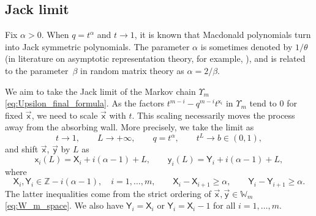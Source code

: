 \documentclass[pdftex]{sigma}
\numberwithin{equation}{section}
\begin{document}
\subsection{Jack limit}

Fix $\alpha>0$.
When $q=t^\alpha$ and $t\to1$, it is known
\cite[Chapter VI.10]{Macdonald1995}
that Macdonald polynomials turn
into Jack symmetric polynomials.
The parameter $\alpha$ is sometimes denoted by $1/\theta$
(in literature on asymptotic representation theory, for example,
\cite{Kerov1998}),
and is related to the parameter~$\beta$ in random matrix theory as
$\alpha=2/\beta$.

We aim to take the Jack limit of the Markov chain $\Upsilon_m$
\eqref{eq:Upsilon_final_formula}.
As the factors
$t^{m-i}-q^{m-i}t^{\mathsf{x}_i}$ in $\Upsilon_m$
tend to $0$ for fixed $\vec{\mathsf{x}}$,
we need to scale $\vec{\mathsf{x}}$ with $t$.
This scaling necessarily moves the process
away from the absorbing wall.
More precisely, we take the limit as
\begin{equation}
	\label{eq:Jack_limit_transition}
	t\to 1,\qquad L\to+\infty,\qquad
	q=t^{\alpha}, \qquad t^L\to b\in(0,1),
\end{equation}
and shift $\vec{\mathsf{x}}$, $\vec{\mathsf{y}}$ by $L$ as
\begin{equation}
	\label{eq:Jack_limit_transition_2}
	\mathsf{x}_i(L)=\mathsf{X}_i+i(\alpha-1)+L,
	\qquad
	\mathsf{y}_i(L)=\mathsf{Y}_i+i(\alpha-1)+L,
\end{equation}
where
\begin{equation}
	\label{eq:shifted_copies_of_Z}
	\mathsf{X}_i, \mathsf{Y}_i\in \mathbb{Z}-i(\alpha-1),
	\quad
	i=1,\dots,m,\qquad
	\mathsf{X}_i-\mathsf{X}_{i+1}\ge \alpha,\qquad
	\mathsf{Y}_i-\mathsf{Y}_{i+1}\ge \alpha.
\end{equation}
The latter inequalities come from the
strict ordering of
$\vec{\mathsf{x}},\vec{\mathsf{y}}\in \mathbb{W}_m$
\eqref{eq:W_m_space}.
We also have $\mathsf{Y}_i=\mathsf{X}_i$ or $\mathsf{Y}_i=\mathsf{X}_i-1$
for all $i=1,\dots,m $.
\end{document}
